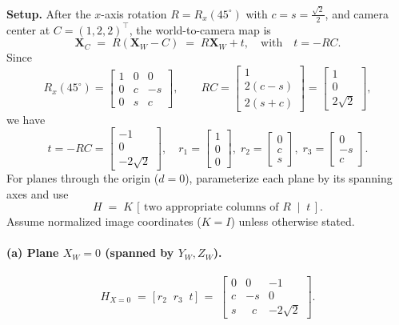 \documentclass[12pt]{article}
\begin{document}
\textbf{Setup.} After the $x$-axis rotation $R=R_x(45^\circ)$ with $c=s=\tfrac{\sqrt{2}}{2}$,
and camera center at $C=(1,2,2)^\top$, the world-to-camera map is
\[
\mathbf{X}_C \;=\; R(\mathbf{X}_W - C)\;=\;R\mathbf{X}_W + t,
\quad\text{with}\quad
t=-RC.
\]
Since
\[
R_x(45^\circ)=
\begin{bmatrix}
1&0&0\\
0&c&-s\\
0&s&c
\end{bmatrix},\qquad
RC=
\begin{bmatrix}
1\\ 2(c-s)\\ 2(s+c)
\end{bmatrix}
=
\begin{bmatrix}
1\\ 0\\ 2\sqrt{2}
\end{bmatrix},
\]
we have
\[
t = -RC = \begin{bmatrix}-1\\ 0\\ -2\sqrt{2}\end{bmatrix},
\quad
r_1=\begin{bmatrix}1\\0\\0\end{bmatrix},\;
r_2=\begin{bmatrix}0\\ c\\ s\end{bmatrix},\;
r_3=\begin{bmatrix}0\\ -s\\ c\end{bmatrix}.
\]
For planes through the origin ($d=0$), parameterize each plane by its spanning axes and use
\[
H \;=\; K\,[\,\text{two appropriate columns of }R \;\;|\;\; t\,].
\]
Assume normalized image coordinates ($K=I$) unless otherwise stated.

\paragraph{(a) Plane $X_W=0$ (spanned by $Y_W,Z_W$).}
\[
H_{X=0} \;=\; \big[\, r_2 \;\; r_3 \;\; t \,\big]
\;=\;
\begin{bmatrix}
0 & 0 & -1\\
c & -s & 0\\
s & \;\;c & -2\sqrt{2}
\end{bmatrix}.
\]
\end{document}
